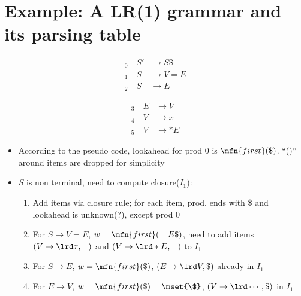 \section*{Example: A LR(1) grammar and its parsing table}
\begin{minipage}{.5\linewidth}
\begin{align*}
  _0\quad S'&\to S\$  \\
  _1\quad S&\to V = E \\
  _2\quad S&\to E
\end{align*}
\end{minipage}
\begin{minipage}{.5\linewidth}
\begin{align*}
  _3\quad  E&\to V   \\
  _4\quad  V&\to x   \\
  _5\quad  V&\to *E
\end{align*}
\end{minipage}
\begin{itemize}
\item According to the pseudo code, lookahead for prod 0 is $\mfn{first}(\$)$. ``()'' around items are dropped for simplicity

  \begin{minipage}{\linewidth}
    \centering
  \end{minipage}
\item $S$ is non terminal, need to compute closure($I_1$):
  \begin{enumerate}
  \item Add items via closure rule; for each item, prod. ends with \$ and lookahead is unknown(?), except prod 0
  \item For $S\to V = E$, $w=\mfn{first}(=E\$)$, need to add items $(V\to \lrd x, =)$ and $(V\to \lrd * E, =)$ to $I_1$
  \item For $S\to E$, $w=\mfn{first}(\$)$, $(E\to \lrd V, \$)$ already in $I_1$
  \item For $E\to V$, $w=\mfn{first}(\$) = \mset{\$}$, $(V\to \lrd\cdots, \$)$ in $I_1$
  \end{enumerate}
\end{itemize}
